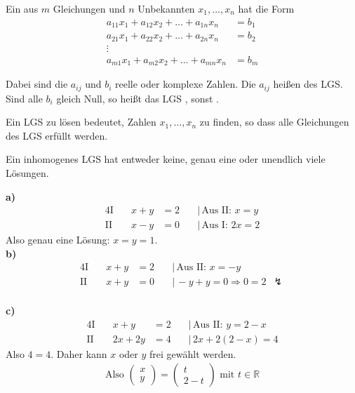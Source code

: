 Ein  aus $m$ Gleichungen und $n$ Unbekannten $x_1,\dots,x_n$ hat die Form
\begin{align*}
    a_{11}x_1 + a_{12}x_2 + \dots + a_{1n}x_n &= b_1 \\
    a_{21}x_1 + a_{22}x_2 + \dots + a_{2n}x_n &= b_2 \\
    \vdots & \\
    a_{m1}x_1 + a_{m2}x_2 + \dots + a_{mn}x_n &= b_m
\end{align*}

Dabei sind die $a_{ij}$ und $b_i$ reelle oder komplexe Zahlen. Die $a_{ij}$ heißen  des LGS. Sind alle $b_i$ gleich Null, so heißt das LGS , sonst .

Ein LGS zu lösen bedeutet, Zahlen $x_1,\dots,x_n$ zu finden, so dass alle Gleichungen des LGS erfüllt werden.

Ein inhomogenes LGS hat entweder keine, genau eine oder unendlich viele Lösungen.


\textbf{a)}
\begin{alignat*}{4}
\text{I}\quad & x+y & = 2 & \quad|\,\text{Aus II: } x = y \\
\text{II}\quad & x-y & = 0 & \quad|\,\text{Aus I: } 2x = 2
\end{alignat*}
Also genau eine Lösung: $x = y = 1$. \\

\textbf{b)}
\begin{alignat*}{4}
\text{I}\quad & x+y & = 2 & \quad|\,\text{Aus II: } x = -y \\
\text{II}\quad & x+y & = 0 & \quad|\,-y+y = 0 \Rightarrow 0 = 2 \enspace\lightning
\end{alignat*} \\

\textbf{c)}
\begin{alignat*}{4}
\text{I}\quad & x+y & = 2 & \quad|\,\text{Aus II: } y = 2 - x \\
\text{II}\quad & 2x + 2y & = 4 & \quad|\,2x + 2(2-x) = 4
\end{alignat*}
Also $4 = 4$. Daher kann $x$ oder $y$ frei gewählt werden.
\begin{align*}
    \text{Also }\begin{pmatrix}x\\y\end{pmatrix} = \begin{pmatrix}t\\2-t\end{pmatrix}\text{ mit }t\in \mathbb{R}
\end{align*}

